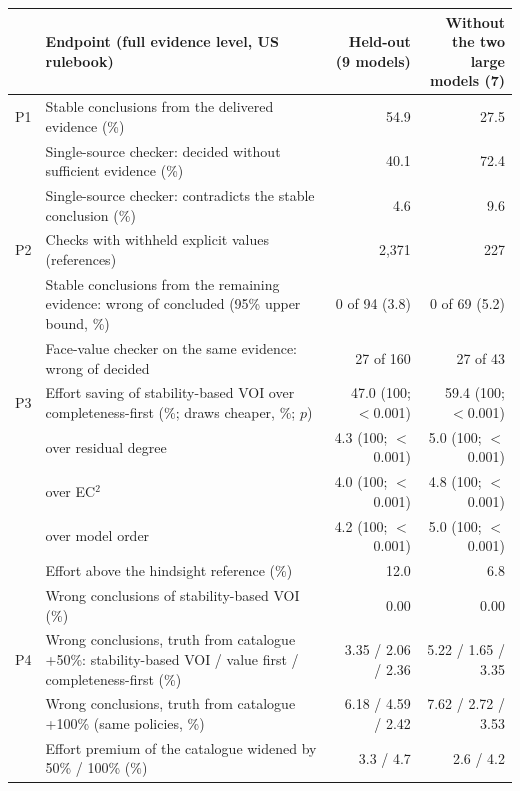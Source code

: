\begin{tabularx}{\textwidth}{@{}lXrr@{}}
\toprule
 & Endpoint (full evidence level, US rulebook) & \shortstack{Held-out\\(9 models)} & \shortstack{Without the two\\large models (7)} \\
\midrule
P1 & Stable conclusions from the delivered evidence (\%) & 54.9 & 27.5 \\
 & Single-source checker: decided without sufficient evidence (\%) & 40.1 & 72.4 \\
 & Single-source checker: contradicts the stable conclusion (\%) & 4.6 & 9.6 \\
\addlinespace
P2 & Checks with withheld explicit values (references) & 2,371 & 227 \\
 & Stable conclusions from the remaining evidence: wrong of concluded (95\% upper bound, \%) & 0 of 94 (3.8) & 0 of 69 (5.2) \\
 & Face-value checker on the same evidence: wrong of decided & 27 of 160 & 27 of 43 \\
\addlinespace
P3 & Effort saving of stability-based VOI over completeness-first (\%; draws cheaper, \%; $p$) & 47.0 (100; $<$0.001) & 59.4 (100; $<$0.001) \\
 & \quad over residual degree & 4.3 (100; $<$0.001) & 5.0 (100; $<$0.001) \\
 & \quad over EC$^2$ & 4.0 (100; $<$0.001) & 4.8 (100; $<$0.001) \\
 & \quad over model order & 4.2 (100; $<$0.001) & 5.0 (100; $<$0.001) \\
 & Effort above the hindsight reference (\%) & 12.0 & 6.8 \\
 & Wrong conclusions of stability-based VOI (\%) & 0.00 & 0.00 \\
\addlinespace
P4 & Wrong conclusions, truth from catalogue +50\%: stability-based VOI / value first / completeness-first (\%) & 3.35 / 2.06 / 2.36 & 5.22 / 1.65 / 3.35 \\
 & Wrong conclusions, truth from catalogue +100\% (same policies, \%) & 6.18 / 4.59 / 2.42 & 7.62 / 2.72 / 3.53 \\
 & Effort premium of the catalogue widened by 50\% / 100\% (\%) & 3.3 / 4.7 & 2.6 / 4.2 \\
\bottomrule
\end{tabularx}
